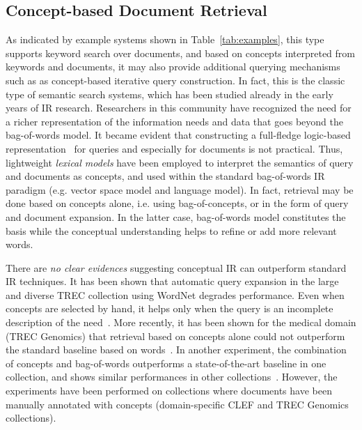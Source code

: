 \subsection{Concept-based Document Retrieval} 
As indicated by example systems shown in Table~\ref{tab:examples}, this type supports keyword search over documents, and based on concepts interpreted from keywords and documents, it may also provide additional querying mechanisms such as as concept-based iterative query construction. In fact, this is the classic type of semantic search systems, which has been studied already in the early years of IR research. Researchers in this community have recognized the need for a richer representation of the information needs and data that goes beyond the bag-of-words model. It became evident that constructing a full-fledge logic-based representation~\cite{DBLP:conf/sigir/Rijsbergen89} for queries and especially for documents is not practical. Thus, lightweight \emph{lexical models} have been employed to interpret the semantics of query and documents as concepts, and used within the standard bag-of-words IR paradigm (e.g. vector space model and language model). In fact, retrieval may be done based on concepts alone, i.e. using bag-of-concepts, or in the form of query and document expansion. In the latter case, bag-of-words model constitutes the basis while the conceptual understanding helps to refine or add more relevant words. 

There are \emph{no clear evidences} suggesting conceptual IR can outperform standard IR techniques. It has been shown that automatic query expansion in the large and diverse TREC collection using WordNet degrades performance. Even when concepts are selected by hand, it helps only when the query is an incomplete description of the need~\cite{DBLP:conf/sigir/Voorhees94}. More recently, it has been shown for the medical domain (TREC Genomics) that retrieval based on concepts alone could not outperform the standard baseline based on words~\cite{DBLP:conf/trec/TrieschniggKS06,DBLP:conf/trec/ZhouYTS06}. In another experiment, the combination of concepts and bag-of-words 
outperforms a state-of-the-art baseline in one collection, and shows similar performances in other collections~\cite{DBLP:journals/ipm/MeijTRK10}. However, the experiments have been performed on 
collections where documents have been manually annotated with concepts (domain-specific CLEF and TREC Genomics collections). 

